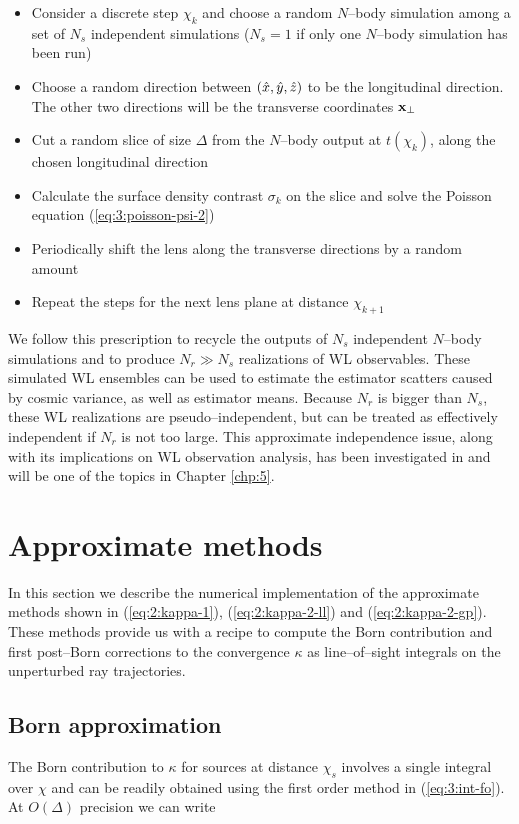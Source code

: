\begin{itemize}
\item Consider a discrete step $\chi_k$ and choose a random $N$--body simulation among a set of $N_s$ independent simulations ($N_s=1$ if only one $N$--body simulation has been run)
\item Choose a random direction between $(\hat{x},\hat{y},\hat{z})$ to be the longitudinal direction. The other two directions will be the transverse coordinates $\mathbf{x}_\perp$
\item Cut a random slice of size $\Delta$ from the $N$--body output at $t(\chi_k)$, along the chosen longitudinal direction
\item Calculate the surface density contrast $\sigma_k$ on the slice and solve the Poisson equation (\ref{eq:3:poisson-psi-2})
\item Periodically shift the lens along the transverse directions by a random amount
\item Repeat the steps for the next lens plane at distance $\chi_{k+1}$
\end{itemize}
%
We follow this prescription to recycle the outputs of $N_s$ independent $N$--body simulations and to produce $N_r\gg N_s$ realizations of WL observables. These simulated WL ensembles can be used to estimate the estimator scatters caused by cosmic variance, as well as estimator means. Because $N_r$ is bigger than $N_s$, these WL realizations are pseudo--independent, but can be treated as effectively independent if $N_r$ is not too large. This approximate independence issue, along with its implications on WL observation analysis, has been investigated in \citep{PetriVariance} and will be one of the topics in Chapter \ref{chp:5}.  


\section{Approximate methods}
In this section we describe the numerical implementation of the approximate methods shown in (\ref{eq:2:kappa-1}), (\ref{eq:2:kappa-2-ll}) and (\ref{eq:2:kappa-2-gp}). These methods provide us with a recipe to compute the Born contribution and first post--Born corrections to the convergence $\kappa$ as line--of--sight integrals on the unperturbed ray trajectories. 

\subsection{Born approximation}
The Born contribution to $\kappa$ for sources at distance $\chi_s$ involves a single integral over $\chi$ and can be readily obtained using the first order method in (\ref{eq:3:int-fo}). At $O(\Delta)$ precision we can write 


